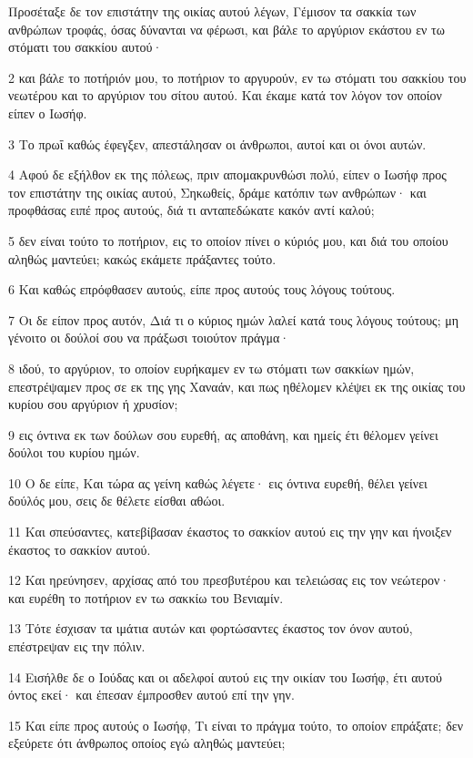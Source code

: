 \par Προσέταξε δε τον επιστάτην της οικίας αυτού λέγων, Γέμισον τα σακκία των ανθρώπων τροφάς, όσας δύνανται να φέρωσι, και βάλε το αργύριον εκάστου εν τω στόματι του σακκίου αυτού·
\par 2 και βάλε το ποτήριόν μου, το ποτήριον το αργυρούν, εν τω στόματι του σακκίου του νεωτέρου και το αργύριον του σίτου αυτού. Και έκαμε κατά τον λόγον τον οποίον είπεν ο Ιωσήφ.
\par 3 Το πρωΐ καθώς έφεγξεν, απεστάλησαν οι άνθρωποι, αυτοί και οι όνοι αυτών.
\par 4 Αφού δε εξήλθον εκ της πόλεως, πριν απομακρυνθώσι πολύ, είπεν ο Ιωσήφ προς τον επιστάτην της οικίας αυτού, Σηκωθείς, δράμε κατόπιν των ανθρώπων· και προφθάσας ειπέ προς αυτούς, διά τι ανταπεδώκατε κακόν αντί καλού;
\par 5 δεν είναι τούτο το ποτήριον, εις το οποίον πίνει ο κύριός μου, και διά του οποίου αληθώς μαντεύει; κακώς εκάμετε πράξαντες τούτο.
\par 6 Και καθώς επρόφθασεν αυτούς, είπε προς αυτούς τους λόγους τούτους.
\par 7 Οι δε είπον προς αυτόν, Διά τι ο κύριος ημών λαλεί κατά τους λόγους τούτους; μη γένοιτο οι δούλοί σου να πράξωσι τοιούτον πράγμα·
\par 8 ιδού, το αργύριον, το οποίον ευρήκαμεν εν τω στόματι των σακκίων ημών, επεστρέψαμεν προς σε εκ της γης Χαναάν, και πως ηθέλομεν κλέψει εκ της οικίας του κυρίου σου αργύριον ή χρυσίον;
\par 9 εις όντινα εκ των δούλων σου ευρεθή, ας αποθάνη, και ημείς έτι θέλομεν γείνει δούλοι του κυρίου ημών.
\par 10 Ο δε είπε, Και τώρα ας γείνη καθώς λέγετε· εις όντινα ευρεθή, θέλει γείνει δούλός μου, σεις δε θέλετε είσθαι αθώοι.
\par 11 Και σπεύσαντες, κατεβίβασαν έκαστος το σακκίον αυτού εις την γην και ήνοιξεν έκαστος το σακκίον αυτού.
\par 12 Και ηρεύνησεν, αρχίσας από του πρεσβυτέρου και τελειώσας εις τον νεώτερον· και ευρέθη το ποτήριον εν τω σακκίω του Βενιαμίν.
\par 13 Τότε έσχισαν τα ιμάτια αυτών και φορτώσαντες έκαστος τον όνον αυτού, επέστρεψαν εις την πόλιν.
\par 14 Εισήλθε δε ο Ιούδας και οι αδελφοί αυτού εις την οικίαν του Ιωσήφ, έτι αυτού όντος εκεί· και έπεσαν έμπροσθεν αυτού επί την γην.
\par 15 Και είπε προς αυτούς ο Ιωσήφ, Τι είναι το πράγμα τούτο, το οποίον επράξατε; δεν εξεύρετε ότι άνθρωπος οποίος εγώ αληθώς μαντεύει;
